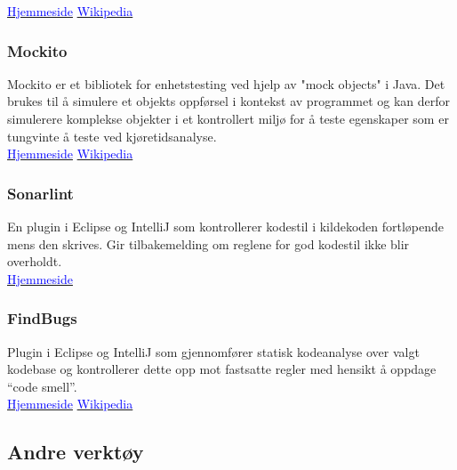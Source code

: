 \documentclass[12pt]{report}
\begin{document}
\href{http://junit.org/junit4/}{\textcolor{blue}{Hjemmeside}} {\textperiodcentered}
\href{https://no.wikipedia.org/wiki/JUnit}{\textcolor{blue}{Wikipedia}}

\subsubsection*{Mockito}

Mockito er et bibliotek for enhetstesting ved hjelp av "mock objects" i Java. Det brukes til {\aa} simulere et objekts oppf{\o}rsel i kontekst av programmet og kan derfor simulerere komplekse objekter i et kontrollert milj{\o} for {\aa} teste egenskaper som er tungvinte {\aa} teste ved kj{\o}retidsanalyse. \\

\href{http://site.mockito.org/}{\textcolor{blue}{Hjemmeside}} {\textperiodcentered}
\href{https://en.wikipedia.org/wiki/Mock_object}{\textcolor{blue}{Wikipedia}}

\subsubsection*{Sonarlint}

En plugin i Eclipse og IntelliJ som kontrollerer kodestil i kildekoden fortl{\o}pende mens den skrives. Gir
tilbakemelding om reglene for god kodestil ikke blir overholdt. \\

\href{http://www.sonarlint.org/}{\textcolor{blue}{Hjemmeside}}

\subsubsection*{FindBugs}

Plugin i Eclipse og IntelliJ som gjennomf{\o}rer statisk kodeanalyse over valgt kodebase og kontrollerer dette opp mot
fastsatte regler med hensikt {\aa} oppdage ``code smell''.  \\

\href{http://findbugs.sourceforge.net/}{\textcolor{blue}{Hjemmeside}} {\textperiodcentered}
\href{https://en.wikipedia.org/wiki/FindBugs}{\textcolor{blue}{Wikipedia}}

\subsection*{Andre verkt{\o}y}
\end{document}

